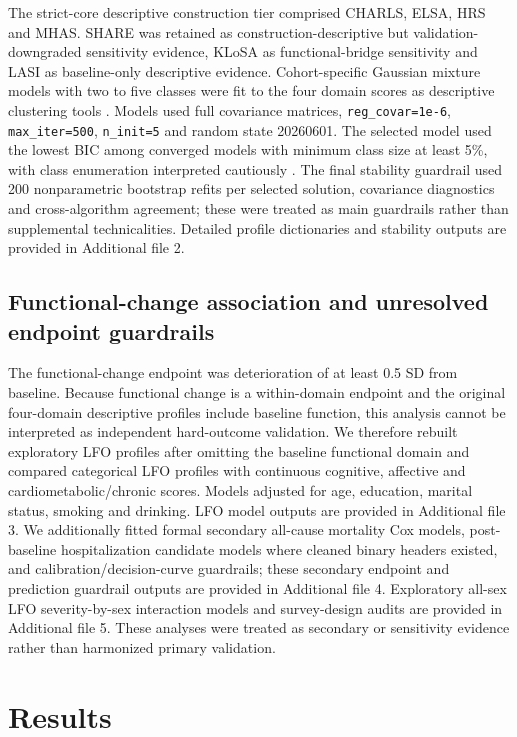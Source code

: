 \documentclass[pdflatex,sn-vancouver-num]{sn-jnl}
\begin{document}
The strict-core descriptive construction tier comprised CHARLS, ELSA, HRS and MHAS. SHARE was retained as construction-descriptive but validation-downgraded sensitivity evidence, KLoSA as functional-bridge sensitivity and LASI as baseline-only descriptive evidence. Cohort-specific Gaussian mixture models with two to five classes were fit to the four domain scores as descriptive clustering tools \cite{mclachlan2000finite}. Models used full covariance matrices, \texttt{reg\_covar=1e-6}, \texttt{max\_iter=500}, \texttt{n\_init=5} and random state 20260601. The selected model used the lowest BIC among converged models with minimum class size at least 5\%, with class enumeration interpreted cautiously \cite{nylund2007classes,hennig2015trueclusters}. The final stability guardrail used 200 nonparametric bootstrap refits per selected solution, covariance diagnostics and cross-algorithm agreement; these were treated as main guardrails rather than supplemental technicalities. Detailed profile dictionaries and stability outputs are provided in Additional file 2.

\subsection{Functional-change association and unresolved endpoint guardrails}

The functional-change endpoint was deterioration of at least 0.5 SD from baseline. Because functional change is a within-domain endpoint and the original four-domain descriptive profiles include baseline function, this analysis cannot be interpreted as independent hard-outcome validation. We therefore rebuilt exploratory LFO profiles after omitting the baseline functional domain and compared categorical LFO profiles with continuous cognitive, affective and cardiometabolic/chronic scores. Models adjusted for age, education, marital status, smoking and drinking. LFO model outputs are provided in Additional file 3. We additionally fitted formal secondary all-cause mortality Cox models, post-baseline hospitalization candidate models where cleaned binary headers existed, and calibration/decision-curve guardrails; these secondary endpoint and prediction guardrail outputs are provided in Additional file 4. Exploratory all-sex LFO severity-by-sex interaction models and survey-design audits are provided in Additional file 5. These analyses were treated as secondary or sensitivity evidence rather than harmonized primary validation.

\section{Results}\label{sec:results}
\end{document}

